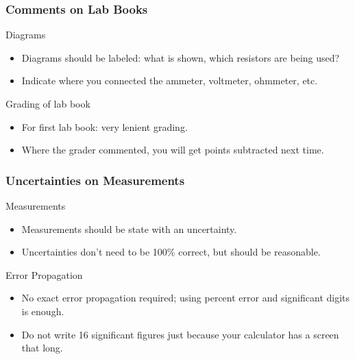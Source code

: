 \documentclass[beamer]{standalone}
\begin{document}
\begin{frame}
\frametitle{Comments on Lab Books}
\begin{block}{Diagrams}
 \begin{itemize}
  \item Diagrams should be labeled: what is shown, which resistors are being used?
  \item Indicate where you connected the ammeter, voltmeter, ohmmeter, etc.
 \end{itemize}
\end{block}
\begin{block}{Grading of lab book}
 \begin{itemize}
  \item For first lab book: very lenient grading.
  \item Where the grader commented, you will get points subtracted next time.
 \end{itemize}
\end{block}
\end{frame}

\begin{frame}
\frametitle{Uncertainties on Measurements}
\begin{block}{Measurements}
 \begin{itemize}
  \item Measurements should be state with an uncertainty.
  \item Uncertainties don't need to be 100\% correct, but should be reasonable.
 \end{itemize}
\end{block}
\begin{block}{Error Propagation}
 \begin{itemize}
  \item No exact error propagation required; using percent error and significant digits is enough.
  \item Do not write 16 significant figures just because your calculator has a screen that long.
 \end{itemize}
\end{block}
\end{frame}
\end{document}
